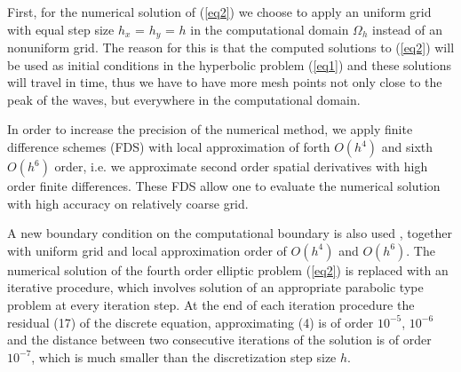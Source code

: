 \documentclass[preprint]{elsarticle}
\newcommand{\rf}[1]{(\ref{#1})}
\begin{document}
First, for the numerical solution of \rf{eq2} we choose to apply an uniform grid with equal step size $h_x$ = $h_y$ = $h$ in the computational domain $\Omega_h$ instead of an nonuniform grid. The reason for this is that  
%
 the computed solutions to \rf{eq2} will be used as initial conditions in the hyperbolic problem \rf{eq1} and these solutions will travel in time, thus we have to have more mesh points not only close to the peak of the waves, but everywhere in   the  computational domain. 

In order to increase the precision of the numerical method, we apply finite difference schemes (FDS) with local approximation of forth $O(h^4)$ and sixth $O(h^6)$ order, i.e. we  approximate second order spatial derivatives with high order finite differences. These  FDS allow one to evaluate the numerical solution with high accuracy on relatively coarse grid. 

A new boundary condition on the computational boundary is also used \cite{bnd}, together with uniform grid and local approximation order of $O(h^4)$ and $O(h^6)$. The numerical solution of the fourth order elliptic problem \rf{eq2} is replaced with an iterative procedure, which involves solution  of an appropriate  parabolic type problem at every iteration step. %
At the end of each iteration procedure the residual (17) of the discrete equation, approximating (4) is of order $10^{-5}$, $10^{-6}$ and the distance between two consecutive iterations of the solution is of order $10^{-7}$, which is much smaller than the discretization step size $h$.
 
\end{document}
